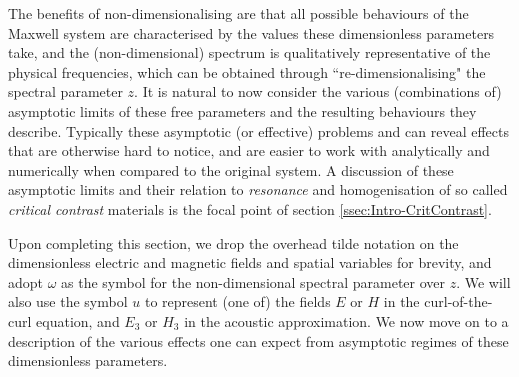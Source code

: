 The benefits of non-dimensionalising are that all possible behaviours of the Maxwell system are characterised by the values these dimensionless parameters take, and the (non-dimensional) spectrum is qualitatively representative of the physical frequencies, which can be obtained through ``re-dimensionalising" the spectral parameter $z$.
It is natural to now consider the various (combinations of) asymptotic limits of these free parameters and the resulting behaviours they describe.
Typically these asymptotic (or effective) problems and can reveal effects that are otherwise hard to notice, and are easier to work with analytically and numerically when compared to the original system.
A discussion of these asymptotic limits and their relation to \emph{resonance} and homogenisation of so called \emph{critical contrast} materials is the focal point of section \ref{ssec:Intro-CritContrast}.

Upon completing this section, we drop the overhead tilde notation on the dimensionless electric and magnetic fields and spatial variables for brevity, and adopt $\omega$ as the symbol for the non-dimensional spectral parameter over $z$.
We will also use the symbol $u$ to represent (one of) the fields $E$ or $H$ in the curl-of-the-curl equation, and $E_3$ or $H_3$ in the acoustic approximation.
We now move on to a description of the various effects one can expect from asymptotic regimes of these dimensionless parameters.